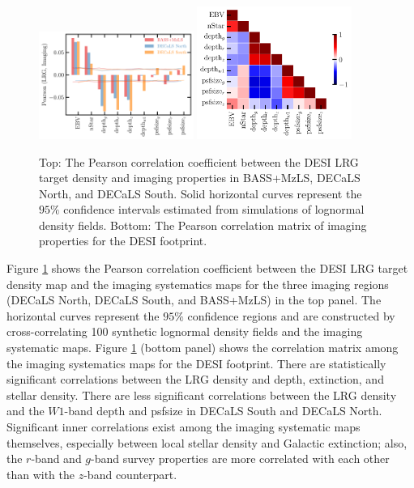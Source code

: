 \begin{figure}
\centering
 \includegraphics[width=0.45\textwidth]{figures/pcc.pdf} 
 \includegraphics[width=0.45\textwidth]{figures/pccx.pdf}  
 \caption{Top: The Pearson correlation coefficient between the DESI LRG target density and imaging properties in BASS+MzLS, DECaLS North, and DECaLS South. Solid horizontal curves represent the $95\%$ confidence intervals estimated from simulations of lognormal density fields. Bottom: The Pearson correlation matrix of imaging properties for the DESI footprint.}
 \label{fig:pcc}
\end{figure}

Figure \ref{fig:pcc} shows the Pearson correlation coefficient between the DESI LRG target density map and the imaging systematics maps for the three imaging regions (DECaLS North, DECaLS South, and BASS+MzLS) in the top panel. The horizontal curves represent the $95\%$ confidence regions and are constructed by cross-correlating 100 synthetic lognormal density fields and the imaging systematic maps. Figure \ref{fig:pcc} (bottom panel) shows the correlation matrix among the imaging systematics maps for the DESI footprint. There are statistically significant correlations between the LRG density and depth, extinction, and stellar density. There are less significant correlations between the LRG density and the $W1$-band depth and psfsize in DECaLS South and DECaLS North. Significant inner correlations exist among the imaging systematic maps themselves, especially between local stellar density and Galactic extinction; also, the $r$-band and $g$-band survey properties are more correlated with each other than with the $z$-band counterpart. 

